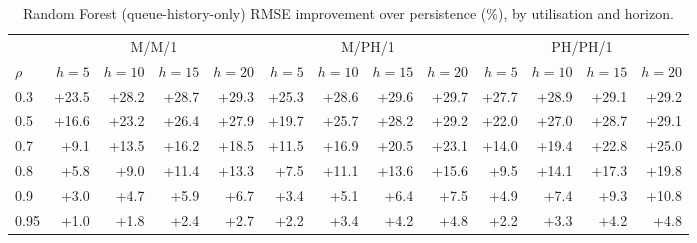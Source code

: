 \begin{table}[htbp]
\centering
\footnotesize
\setlength{\tabcolsep}{3.5pt}
\caption{Random Forest (queue-history-only) RMSE improvement over persistence (\%), by utilisation and horizon.}
\label{tab:consolidated_rmse_impr}
\begin{tabular}{lrrrrrrrrrrrr}
\toprule
 & \multicolumn{4}{c}{M/M/1} & \multicolumn{4}{c}{M/PH/1} & \multicolumn{4}{c}{PH/PH/1} \\
\cmidrule(lr){2-5}\cmidrule(lr){6-9}\cmidrule(lr){10-13}
$\rho$ & $h=5$ & $h=10$ & $h=15$ & $h=20$ & $h=5$ & $h=10$ & $h=15$ & $h=20$ & $h=5$ & $h=10$ & $h=15$ & $h=20$ \\
\midrule
0.3 & +23.5 & +28.2 & +28.7 & +29.3 & +25.3 & +28.6 & +29.6 & +29.7 & +27.7 & +28.9 & +29.1 & +29.2 \\
0.5 & +16.6 & +23.2 & +26.4 & +27.9 & +19.7 & +25.7 & +28.2 & +29.2 & +22.0 & +27.0 & +28.7 & +29.1 \\
0.7 & +9.1 & +13.5 & +16.2 & +18.5 & +11.5 & +16.9 & +20.5 & +23.1 & +14.0 & +19.4 & +22.8 & +25.0 \\
0.8 & +5.8 & +9.0 & +11.4 & +13.3 & +7.5 & +11.1 & +13.6 & +15.6 & +9.5 & +14.1 & +17.3 & +19.8 \\
0.9 & +3.0 & +4.7 & +5.9 & +6.7 & +3.4 & +5.1 & +6.4 & +7.5 & +4.9 & +7.4 & +9.3 & +10.8 \\
0.95 & +1.0 & +1.8 & +2.4 & +2.7 & +2.2 & +3.4 & +4.2 & +4.8 & +2.2 & +3.3 & +4.2 & +4.8 \\
\bottomrule
\end{tabular}
\end{table}

